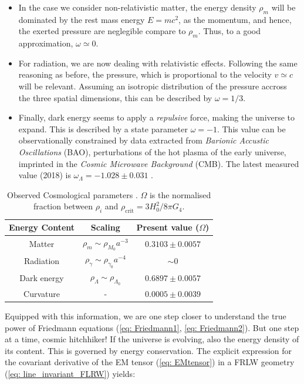 \documentclass[11pt, a4paper]{article} %
\begin{document}
\begin{itemize}
	\item In the case we consider non-relativistic matter, the energy density $\rho_{m}$ will be dominated by the rest mass energy $E = mc^{2}$, as the momentum, and hence, the exerted pressure are neglegible compare to $\rho_{m}$. Thus, to a good approximation, $\omega \simeq 0$.
	\item For radiation, we are now dealing with relativistic effects. Following the same reasoning as before, the pressure, which is proportional to the velocity $v \simeq c$ will be relevant. Assuming an isotropic distribution of the pressure accross the three spatial dimensions, this can be described by $\omega = 1/3$.
	\item Finally, dark energy seems to apply a \textit{repulsive} force, making the universe to expand. This is described by a state parameter $\omega = - 1$. This value can be observationally constrained by data extracted from \textit{Barionic Accustic Oscillations} (BAO), perturbations of the hot plasma of the early universe, imprinted in the \textit{Cosmic Microwave Background} (CMB). The latest measured value (2018) is $\omega_{\Lambda} = -1.028 \pm 0.031$ \cite{2020planck}.
\end{itemize}
\vspace{0.5cm}
\begin{table}[h!]
	\centering
	\begin{tabular}{ccc}
	\toprule
	\textbf{Energy Content} & \textbf{Scaling} & \textbf{Present value ($\Omega$)} \\
	\midrule
	Matter & $\rho_{m} \sim \rho_{M_{0}} a^{-3}$ & $0.3103 \pm 0.0057$ \\
	Radiation & $\rho_{\gamma} \sim \rho_{\gamma_{0}} a^{-4}$ & $\sim 0$  \\
	Dark energy & $\rho_{\Lambda} \sim \rho_{\Lambda_{0}}$ & $0.6897 \pm 0.0057$ \\
	\hline
	Curvature & - & $0.0005\pm0.0039$  \\
	\bottomrule
	\end{tabular}
	\caption{Observed Cosmological parameters \cite{2020planck}. $\Omega$ is the normalised fraction between $\rho_{i}$ and $\rho_{\text{crit}} = 3 H_{0}^{2}/8\pi G_{4}$.}
	\label{Table: energy_density}
\end{table}

Equipped with this information, we are one step closer to understand the true power of Friedmann equations (\ref{eq: Friedmann1}, \ref{eq: Friedmann2}). But one step at a time, cosmic hitchhiker! If the universe is evolving, also the energy density of its content. This is governed by energy conservation. The explicit expression for the covariant derivative of the EM tensor (\ref{eq: EMtensor}) in a FRLW geometry (\ref{eq: line_invariant_FLRW}) yields:
\end{document}
